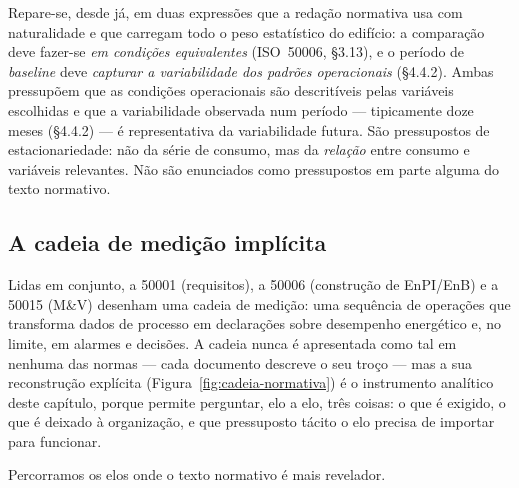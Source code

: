 Repare-se, desde já, em duas expressões que a redação normativa usa com naturalidade e que carregam todo o peso estatístico do edifício: a comparação deve fazer-se \emph{em condições equivalentes} (ISO~50006, \S3.13), e o período de \emph{baseline} deve \emph{capturar a variabilidade dos padrões operacionais} (\S4.4.2). Ambas pressupõem que as condições operacionais são descritíveis pelas variáveis escolhidas e que a variabilidade observada num período --- tipicamente doze meses (\S4.4.2) --- é representativa da variabilidade futura. São pressupostos de estacionariedade: não da série de consumo, mas da \emph{relação} entre consumo e variáveis relevantes. Não são enunciados como pressupostos em parte alguma do texto normativo.

\subsection{A cadeia de medição implícita}
\label{sec:enb-cadeia}

Lidas em conjunto, a 50001 (requisitos), a 50006 (construção de EnPI/EnB) e a 50015 (M\&V) desenham uma cadeia de medição: uma sequência de operações que transforma dados de processo em declarações sobre desempenho energético e, no limite, em alarmes e decisões. A cadeia nunca é apresentada como tal em nenhuma das normas --- cada documento descreve o seu troço --- mas a sua reconstrução explícita (Figura~\ref{fig:cadeia-normativa}) é o instrumento analítico deste capítulo, porque permite perguntar, elo a elo, três coisas: o que é exigido, o que é deixado à organização, e que pressuposto tácito o elo precisa de importar para funcionar. 

\newpage


Percorramos os elos onde o texto normativo é mais revelador.

